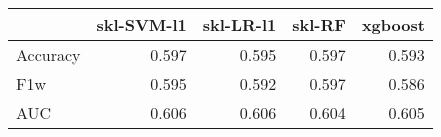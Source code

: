 \begin{tabular}{lrrrr}
\toprule
{} &  skl-SVM-l1 &  skl-LR-l1 &  skl-RF &  xgboost \\
\midrule
Accuracy &       0.597 &      0.595 &   0.597 &    0.593 \\
F1w      &       0.595 &      0.592 &   0.597 &    0.586 \\
AUC      &       0.606 &      0.606 &   0.604 &    0.605 \\
\bottomrule
\end{tabular}
